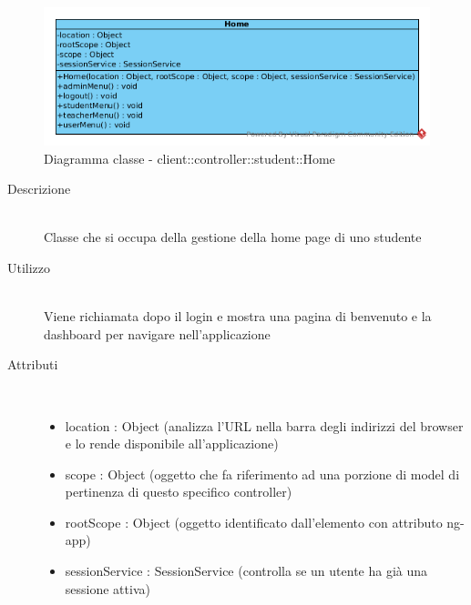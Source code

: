 \begin{center}
			\begin{figure}[H]
				\centering \includegraphics[scale=4, max width=\textwidth, max height=\myheight]{../img/diagrammiClassi/client/controller/student/Home.png}
				\caption{Diagramma classe - client::controller::student::Home}
			\end{figure}
		\end{center}\begin{description}
\item[Descrizione] \hfill \\
 Classe che si occupa della gestione della home page di uno studente
\item[Utilizzo] \hfill \\
 Viene richiamata dopo il login e mostra una pagina di benvenuto e la dashboard per navigare nell'applicazione
\item[Attributi] \hfill \\
 \vspace{-7mm}
\begin{itemize}
\item location : Object (analizza l'URL nella barra degli indirizzi del browser e lo rende disponibile all'applicazione)
\item scope : Object (oggetto che fa riferimento ad una porzione di model di pertinenza di questo specifico controller)
\item rootScope : Object (oggetto identificato dall’elemento con attributo ng-app)
\item sessionService : SessionService (controlla se un utente ha già una sessione attiva)
\end{itemize}


\end{description}
